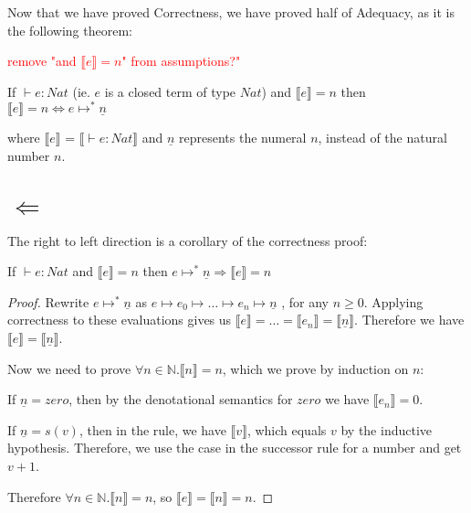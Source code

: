 
Now that we have proved Correctness, we have proved half of Adequacy, as it is the following theorem:

\textcolor{red}{remove "and $\llbracket e \rrbracket = n$" from assumptions?"}

\vspace{0.5cm}

\begin{thm}
If $\vdash e : Nat$ (ie. $e$ is a closed term of type $Nat$) and $\llbracket e \rrbracket = n$ then $\llbracket e \rrbracket = n \Leftrightarrow e \mapsto^* \underline{n}$
\end{thm}

where $\llbracket e \rrbracket$ = $\llbracket \vdash e : Nat \rrbracket$ and $\underline{n}$ represents the numeral $n$, instead of the natural number $n$.

\section{$\Leftarrow$}
The right to left direction is a corollary of the correctness proof:

\vspace{0.5cm}

\begin{cor}
If $\vdash e : Nat$ and $\llbracket e \rrbracket = n$ then $e \mapsto^* \underline{n} \Rightarrow \llbracket e \rrbracket = n$
\end{cor}


\begin{proof}
Rewrite $e \mapsto^* \underline{n}$ as $e \mapsto e_0 \mapsto \dots \mapsto e_n \mapsto \underline{n}$ , for any $n \geq 0$. Applying correctness to these evaluations gives us $\llbracket e\rrbracket = \dots = \llbracket e_n \rrbracket = \llbracket \underline{n} \rrbracket$. Therefore we have $\llbracket  e \rrbracket = \llbracket \underline{n} \rrbracket$.

Now we need to prove $\forall n \in \mathbb{N}. \llbracket n \rrbracket = n$, which we prove by induction on $n$:

If $\underline{n} = zero$, then by the denotational semantics for $ zero$ we have $\llbracket e_n \rrbracket =  0$.

If $\underline{n} = s(v)$, then  in the rule, we have $\llbracket v \rrbracket$, which equals $v$ by the inductive hypothesis. Therefore, we use the case in the successor rule for a number and get $v + 1$.

Therefore $\forall n \in \mathbb{N}. \llbracket n \rrbracket  = n$, so $\llbracket e \rrbracket =  \llbracket n \rrbracket  = n$.

\end{proof} 

